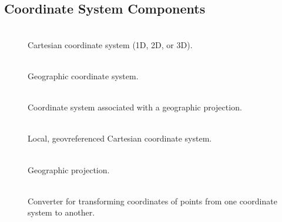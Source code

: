 \subsection{Coordinate System Components}
\begin{description}
\item [] \\
Cartesian coordinate system (1D, 2D, or 3D).
\item [] \\
Geographic coordinate system.
\item [] \\
Coordinate system associated with a geographic projection.
\item [] \\
Local, geovreferenced Cartesian coordinate system.
\item [] \\
Geographic projection.
\item [] \\
Converter for transforming coordinates of points from one coordinate
system to another.
\end{description}

